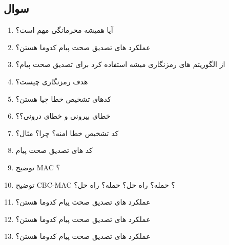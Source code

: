 \documentclass{report}
\begin{document}
	\subsection{سوال}
	\begin{enumerate}
		\item 
		  آیا همیشه محرمانگی مهم است؟
		\item 
		  عملکرد های تصدیق صحت پیام کدوما هستن؟
		  \item 
		       از الگوریتم های رمزنگاری میشه استفاده کرد برای تصدیق صحت پیام؟
		  
		  \item 
		 هدف رمزنگاری چیست؟
		  \item 
		  کدهای تشخیص خطا چیا هستن؟
		  \item 
		خطای بیرونی و خطای درونی؟؟
		  \item 
  کد تشخیص خطا امنه؟ چرا؟ مثال؟
		  \item 
کد های تصدیق صحت پیام
		  \item 
توضیح MAC ؟
		  \item 
توضیح CBC-MAC ؟ حمله؟ راه حل؟ حمله؟ راه حل؟
		  \item 
عملکرد های تصدیق صحت پیام کدوما هستن؟
		  \item 
عملکرد های تصدیق صحت پیام کدوما هستن؟
		  \item 
عملکرد های تصدیق صحت پیام کدوما هستن؟
		  
	\end{enumerate}
\end{document}

